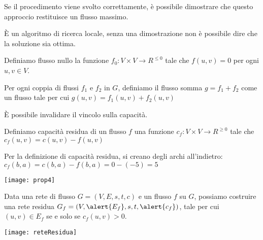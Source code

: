 Se il procedimento viene svolto correttamente, è possibile dimostrare che questo approccio restituisce un flusso massimo.

\begin{note}
\`{E} un algoritmo di ricerca locale, senza una dimostrazione non è possibile dire che la soluzione sia ottima.
\end{note}

\begin{definition}
Definiamo \alert{flusso nullo} la funzione \(f_0 \colon V \times V \to R^{\leqslant 0}\) tale che \(f(u,v) = 0\) per ogni \(u, v \in V\).
\end{definition}

\begin{definition}
Per ogni coppia di flussi \(f_1\) e \(f_2\) in \(G\), definiamo il \alert{flusso somma} \(g = f_1 + f_2\) come un flusso tale per cui \(g(u,v) = f_1(u,v) + f_2(u,v)\)
\end{definition}
\begin{note}
\`{E} possibile invalidare il vincolo sulla capacità.
\end{note}

\begin{minipage}{.5\linewidth}
\begin{definition}
	Definiamo \alert{capacità residua} di un flusso \(f\) una funzione \mbox{\(c_{f}\colon V \times V \to R^{\geqslant 0}\)} tale che \(c_{f}(u,v) = c(u,v) - f(u,v)\)
	\end{definition}
	Per la definizione di capacità residua, si creano degli archi all'indietro: \(c_{f}(b,a) = c(b,a) - f(b,a) = 0 - (-5) = 5\)
\end{minipage}
\begin{minipage}{.5\linewidth}\centering
	\texttt{[image: prop4]}
\end{minipage}

\begin{minipage}{.5\linewidth}
	\begin{definition}
	Data una rete di flusso \(G = (V, E, s, t, c)\) e un flusso \(f\) su \(G\), possiamo costruire una \alert{rete residua} \(G_f = (V, \alert{E_f}, s, t, \alert{c_f})\), tale per cui \((u,v) \in E_f\) se e solo se \(c_f(u,v) > 0\).
	\end{definition}
\end{minipage}
\begin{minipage}{.5\linewidth}
	\centering
	\texttt{[image: reteResidua]}
\end{minipage}


